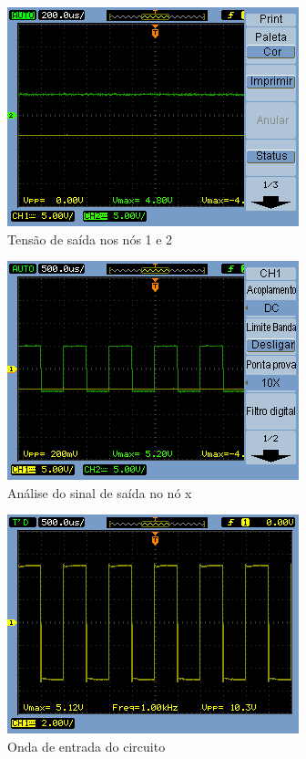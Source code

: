 \documentclass[a4paper]{article} %
\begin{document}
\newpage
\begin{figure}[h!]
\begin{centering}
\includegraphics[scale=0.7]{Imagens/3.4duplicador_tensao/423} \caption{Tensão de saída nos nós 1 e 2 \label{fig:q4-no12}}
\par\end{centering}
\end{figure}


\begin{figure}[h!]
\begin{centering}
\includegraphics[scale=0.7]{Imagens/3.4duplicador_tensao/444} \caption{Análise do sinal de saída no nó x \label{fig:q4-no}}
\par\end{centering}
\end{figure}


\begin{figure}[h!]
\begin{centering}
\includegraphics[scale=0.7]{Imagens/3.4duplicador_tensao/Vin} \caption{Onda de entrada do circuito\label{fig:q4-vin}}
\par\end{centering}
\end{figure}
\end{document}
